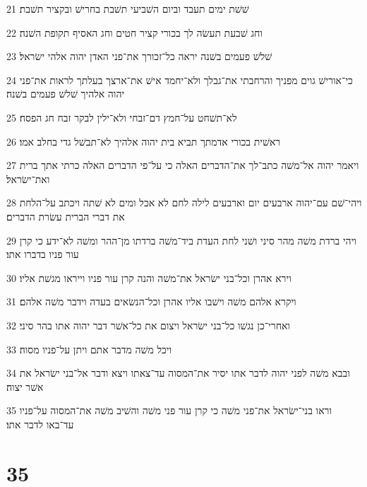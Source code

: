 \par 21 שׁשׁת ימים תעבד וביום השׁביעי תשׁבת בחרישׁ ובקציר תשׁבת׃
\par 22 וחג שׁבעת תעשׂה לך בכורי קציר חטים וחג האסיף תקופת השׁנה׃
\par 23 שׁלשׁ פעמים בשׁנה יראה כל־זכורך את־פני האדן יהוה אלהי ישׂראל׃
\par 24 כי־אורישׁ גוים מפניך והרחבתי את־גבלך ולא־יחמד אישׁ את־ארצך בעלתך לראות את־פני יהוה אלהיך שׁלשׁ פעמים בשׁנה׃
\par 25 לא־תשׁחט על־חמץ דם־זבחי ולא־ילין לבקר זבח חג הפסח׃
\par 26 ראשׁית בכורי אדמתך תביא בית יהוה אלהיך לא־תבשׁל גדי בחלב אמו׃
\par 27 ויאמר יהוה אל־משׁה כתב־לך את־הדברים האלה כי על־פי הדברים האלה כרתי אתך ברית ואת־ישׂראל׃
\par 28 ויהי־שׁם עם־יהוה ארבעים יום וארבעים לילה לחם לא אכל ומים לא שׁתה ויכתב על־הלחת את דברי הברית עשׂרת הדברים׃
\par 29 ויהי ברדת משׁה מהר סיני ושׁני לחת העדת ביד־משׁה ברדתו מן־ההר ומשׁה לא־ידע כי קרן עור פניו בדברו אתו׃
\par 30 וירא אהרן וכל־בני ישׂראל את־משׁה והנה קרן עור פניו וייראו מגשׁת אליו׃
\par 31 ויקרא אלהם משׁה וישׁבו אליו אהרן וכל־הנשׂאים בעדה וידבר משׁה אלהם׃
\par 32 ואחרי־כן נגשׁו כל־בני ישׂראל ויצום את כל־אשׁר דבר יהוה אתו בהר סיני׃
\par 33 ויכל משׁה מדבר אתם ויתן על־פניו מסוה׃
\par 34 ובבא משׁה לפני יהוה לדבר אתו יסיר את־המסוה עד־צאתו ויצא ודבר אל־בני ישׂראל את אשׁר יצוה׃
\par 35 וראו בני־ישׂראל את־פני משׁה כי קרן עור פני משׁה והשׁיב משׁה את־המסוה על־פניו עד־באו לדבר אתו׃

\chapter{35}

